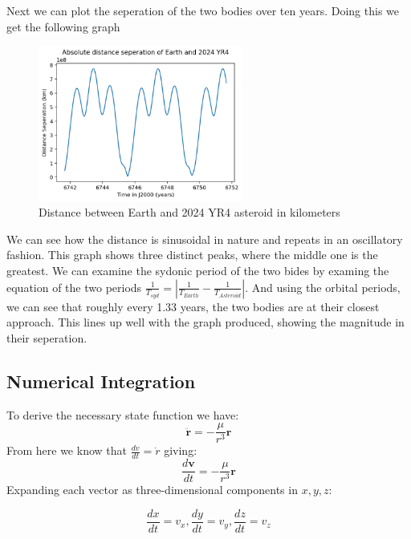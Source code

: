 \documentclass[a4paper, 12pt]{article}  %
\begin{document}
\noindent Next we can plot the seperation of the two bodies over ten years. Doing this we get the following graph

\begin{figure}[H]
    \centering
    \includegraphics[width=0.6\textwidth]{115-dis.png}
    \caption{Distance between Earth and 2024 YR4 asteroid in kilometers}
    \label{fig:example}
\end{figure}

\noindent We can see how the distance is sinusoidal in nature and repeats in an oscillatory fashion. 
This graph shows three distinct peaks, where the middle one is the greatest. We can examine the sydonic period of 
the two bides by examing the equation of the two periods $\frac{1}{T_{syd}} = |\frac{1}{T_{Earth}} - \frac{1}{T_{Asteroid}}|$. And using the orbital periods,
we can see that roughly every 1.33 years, the two bodies are at their closest approach. This lines up well with the graph produced,
showing the magnitude in their seperation. 


\subsection{Numerical Integration}
To derive the necessary state function we have:
\begin{equation}
    \ddot{\mathbf{r}} = -\frac{\mu}{r^3} \mathbf{r}
\end{equation}
From here we know that $\frac{dv}{dt} = \dot{r}$ giving:
\begin{equation}
    \frac{d\mathbf{v}}{dt} = -\frac{\mu}{r^3} \mathbf{r}
\end{equation}
Expanding each vector as three-dimensional components in $x,y,z$:

\begin{equation}
    \frac{dx}{dt} = v_{x},  \frac{dy}{dt} = v_{y},   \frac{dz}{dt} = v_{z}
\end{equation}
\end{document}
